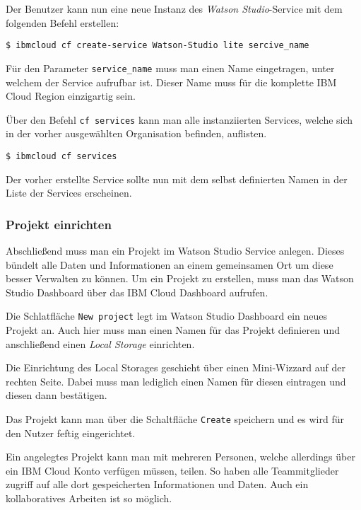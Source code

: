 Der Benutzer kann nun eine neue Instanz des \textit{Watson Studio}-Service mit dem folgenden Befehl erstellen:

\begin{lstlisting}[caption=Instanziierung des Watson Studio Services, label=ls:vorbereitung_watsonservice]
    $ ibmcloud cf create-service Watson-Studio lite sercive_name
\end{lstlisting}

Für den Parameter \texttt{service\_name} muss man einen Name eingetragen, unter welchem der Service aufrufbar ist.
Dieser Name muss für die komplette IBM Cloud Region einzigartig sein.

Über den Befehl \texttt{cf services} kann man alle instanziierten Services, welche sich in der vorher ausgewählten
Organisation befinden, auflisten.

\begin{lstlisting}[caption=Auflisten aller Services in einer Organisation, label=ls:vorbereitung_alleservices]
    $ ibmcloud cf services
\end{lstlisting}

Der vorher erstellte Service sollte nun mit dem selbst definierten Namen in der Liste der Services erscheinen.

\subsubsection{Projekt einrichten}
Abschließend muss man ein Projekt im Watson Studio Service anlegen. Dieses bündelt alle Daten und Informationen an einem
gemeinsamen Ort um diese besser Verwalten zu können. Um ein Projekt zu erstellen, muss man das Watson Studio Dashboard
über das IBM Cloud Dashboard aufrufen.

Die Schlatfläche \texttt{New project} legt im Watson Studio Dashboard ein neues Projekt an. Auch hier muss man einen
Namen für das Projekt definieren und anschließend einen \textit{Local Storage} einrichten.

Die Einrichtung des Local Storages geschieht über einen Mini-Wizzard auf der rechten Seite. Dabei muss man lediglich
einen Namen für diesen eintragen und diesen dann bestätigen.

Das Projekt kann man über die Schaltfläche \texttt{Create} speichern und es wird für den Nutzer feftig eingerichtet.

Ein angelegtes Projekt kann man mit mehreren Personen, welche allerdings über ein IBM Cloud Konto verfügen müssen,
teilen. So haben alle Teammitglieder zugriff auf alle dort gespeicherten Informationen und Daten. Auch ein
kollaboratives Arbeiten ist so möglich.

